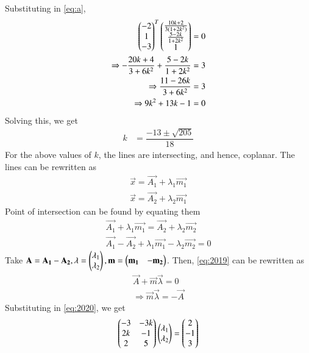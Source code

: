 \documentclass[journal,12pt,twocolumn]{IEEEtran}
\begin{document}
Substituting in \eqref{eq:a},
\begin{align}
    \begin{pmatrix}-2\\1\\-3\end{pmatrix}^{T}\begin{pmatrix}\frac{10k+2}{3(1+2k^{2})}\\\frac{5-2k}{1+2k^{2}}\\1\end{pmatrix}&=0\\
    \Rightarrow -\frac{20k+4}{3+6k^{2}}+\frac{5-2k}{1+2k^{2}}&=3\\
    \Rightarrow \frac{11-26k}{3+6k^{2}}&=3\\
    \Rightarrow 9k^2+13k-1&=0\label{eq:quad}
\end{align}
Solving this, we get
\begin{align}
    k&=\dfrac{-13\pm \sqrt{205}}{18}
\end{align}
For the above values of $k$, the lines are intersecting, and hence, coplanar. The lines can be rewritten as
\begin{align}
    \vec{x}=\vec{A_{1}}+\lambda_{1}\vec{m_{1}}\label{eq:form}\\
    \vec{x}=\vec{A_{2}}+\lambda_{2}\vec{m_{1}}
\end{align}
Point of intersection can be found by equating them
\begin{align}
    \vec{A_{1}}+\lambda_{1}\vec{m_{1}}=\vec{A_{2}}+\lambda_{2}\vec{m_{2}}\\
    \vec{A_{1}}-\vec{A_{2}}+\lambda_{1}\vec{m_{1}}-\lambda_{2}\vec{m_{2}}=0\label{eq:2019}
\end{align}
Take $\mathbf{A}=\mathbf{A_{1}}-\mathbf{A_{2}},\mathbf{\lambda}=\begin{pmatrix}\lambda_{1}\\\lambda_{2}\end{pmatrix},\mathbf{m}=\begin{pmatrix}\mathbf{m_{1}} & -\mathbf{m_{2}}\end{pmatrix}$. Then, \eqref{eq:2019} can be rewritten as
\begin{align}
    \vec{A}+\vec{m}\vec{\lambda}=0\\
    \Rightarrow\vec{m}\vec{\lambda}=-\vec{A}\label{eq:2020}
\end{align}
Substituting in \eqref{eq:2020}, we get
\begin{align}
    \begin{pmatrix}-3 & -3k\\
    2k & -1\\
    2 &  5\end{pmatrix}\begin{pmatrix}\lambda_{1}\\\lambda_{2}\end{pmatrix}=\begin{pmatrix}2\\-1\\3\end{pmatrix}
\end{align}
\end{document}
